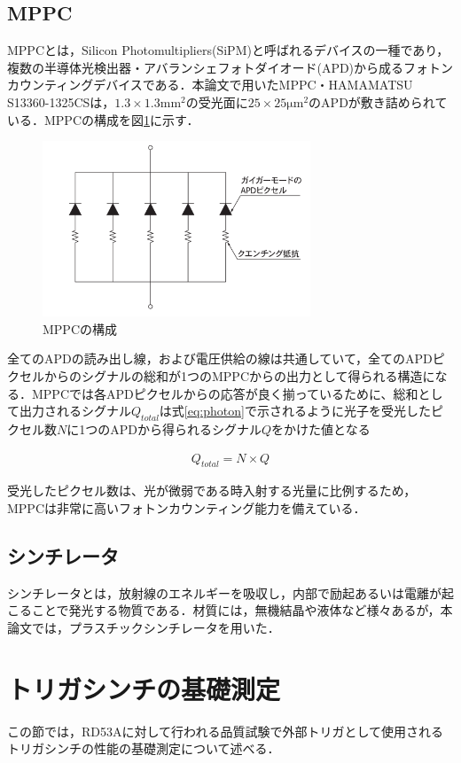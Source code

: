 \subsection*{MPPC}
MPPCとは，Silicon Photomultipliers(SiPM)と呼ばれるデバイスの一種であり，複数の半導体光検出器・アバランシェフォトダイオード(APD)から成るフォトンカウンティングデバイスである．本論文で用いたMPPC・HAMAMATSU S13360-1325CSは，$1.3 \times 1.3 \mathrm{mm^2}$の受光面に$25 \times 25 \mathrm{\mu m^2}$のAPDが敷き詰められている．MPPCの構成を図\ref{fig:APD}に示す．

\begin{figure}[h]
  \centering
  \includegraphics[width=8cm]{./figure/apd.png}
  \caption{MPPCの構成\cite{03handbo69:online}}
  \label{fig:APD}
\end{figure}

全てのAPDの読み出し線，および電圧供給の線は共通していて，全てのAPDピクセルからのシグナルの総和が1つのMPPCからの出力として得られる構造になる．MPPCでは各APDピクセルからの応答が良く揃っているために、総和として出力されるシグナル$Q_{total}$は式\ref{eq:photon}で示されるように光子を受光したピクセル数$N$に1つのAPDから得られるシグナル$Q$をかけた値となる

\begin{eqnarray}
  Q_{total} = N \times Q
\end{eqnarray}

受光したピクセル数は、光が微弱である時入射する光量に比例するため， MPPCは非常に高いフォトンカウンティング能力を備えている．

\subsection*{シンチレータ}
シンチレータとは，放射線のエネルギーを吸収し，内部で励起あるいは電離が起こることで発光する物質である．材質には，無機結晶や液体など様々あるが，本論文では，プラスチックシンチレータを用いた．

\section{トリガシンチの基礎測定}
この節では，RD53Aに対して行われる品質試験で外部トリガとして使用されるトリガシンチの性能の基礎測定について述べる．

